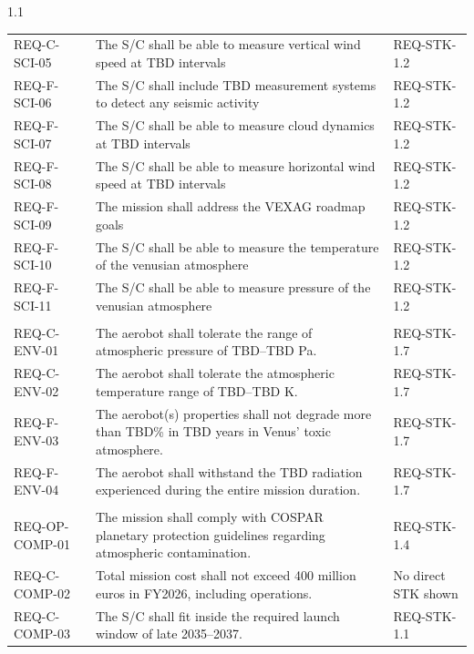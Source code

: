 {{\begin{spacing}{1.1}
\begin{longtable}{@{}
>{\raggedright\arraybackslash}p{}
>{\raggedright\arraybackslash}p{}
>{\raggedright\arraybackslash}p{}
@{}}
REQ-C-SCI-05 &
The S/C shall be able to measure vertical wind speed at TBD intervals &
REQ-STK-1.2 \\
REQ-F-SCI-06 & The S/C shall include TBD measurement systems to detect any seismic activity  & REQ-STK-1.2 \\
REQ-F-SCI-07 & The S/C shall be able to measure cloud dynamics at TBD intervals & REQ-STK-1.2 \\
REQ-F-SCI-08 & The S/C shall be able to measure horizontal wind speed at TBD intervals & REQ-STK-1.2 \\
REQ-F-SCI-09 &  The mission shall address the VEXAG roadmap goals & REQ-STK-1.2 \\
REQ-F-SCI-10 & The S/C shall be able to measure the temperature of the venusian atmosphere & REQ-STK-1.2 \\
REQ-F-SCI-11 & The S/C shall be able to measure pressure of the venusian atmosphere  & REQ-STK-1.2 \\

\multicolumn{3}{@{}l}{\textbf{Survive Operating Environment}} \\
\midrule

REQ-C-ENV-01 &
The aerobot shall tolerate the range of atmospheric pressure of TBD--TBD Pa. &
REQ-STK-1.7 \\

REQ-C-ENV-02 &
The aerobot shall tolerate the atmospheric temperature range of TBD--TBD K. &
REQ-STK-1.7 \\

REQ-F-ENV-03 &
The aerobot(s) properties shall not degrade more than TBD\% in TBD years in Venus' toxic atmosphere. &
REQ-STK-1.7 \\

REQ-F-ENV-04 &
The aerobot shall withstand the TBD radiation experienced during the entire mission duration. &
REQ-STK-1.7 \\



\multicolumn{3}{@{}l}{\textbf{External Compliance}} \\
\midrule

REQ-OP-COMP-01 &
The mission shall comply with COSPAR planetary protection guidelines regarding atmospheric contamination. &
REQ-STK-1.4 \\

REQ-C-COMP-02 &
Total mission cost shall not exceed 400 million euros in FY2026, including operations. &
No direct STK shown \\

REQ-C-COMP-03 &
The S/C shall fit inside the required launch window of late 2035--2037. &
REQ-STK-1.1 \\


\end{longtable}
\end{spacing}}}
